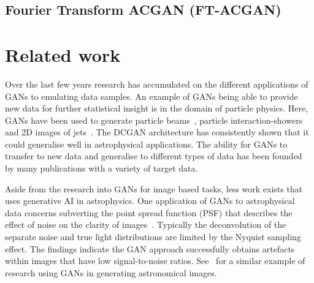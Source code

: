 \documentclass[twocolumn]{article}
\numberwithin{equation}{section}
\begin{document}
\subsection{Fourier Transform ACGAN (FT-ACGAN)}


\section{Related work}\label{sec:related_work}
Over the last few years research has accumulated on the different applications of GANs to emulating data samples. An 
example of GANs being able to provide new data for further statistical insight is in the domain of particle physics. Here, 
GANs have been used to generate particle beams~\cite{muon_beams_gan}, particle interaction-showers~\cite{particle_showers_gan} 
and 2D images of jets~\cite{particle_jets_gan}. The DCGAN architecture has consistently shown that it could generalise well 
in astrophysical applications. The ability for GANs to transfer to new data and generalise to different types of data has 
been founded by many publications with a variety of target data.

Aside from the research into GANs for image based tasks, less work exists that uses generative AI in astrophysics. One 
application of GANs to astrophysical data concerns subverting the point spread function (PSF) that describes the effect 
of noise on the clarity of images~\cite{gal_im_gen3}. Typically the deconvolution of the separate noise and true light 
distributions are limited by the Nyquist sampling effect. The findings indicate the GAN approach successfully obtains 
artefacts within images that have low signal-to-noise ratios. See~\cite{gal_im_gen2} for a similar example of research 
using GANs in generating astronomical images.
\end{document}

